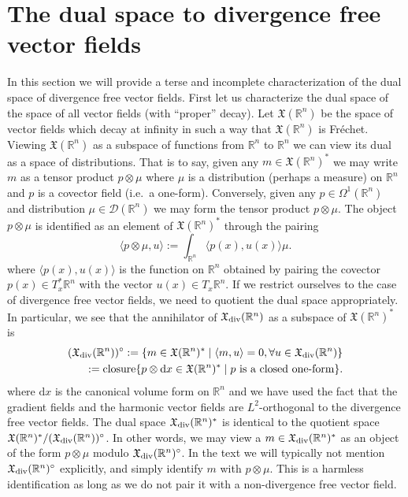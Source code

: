 \documentclass[12pt]{amsart}
\newcommand{\R}{\ensuremath{\mathbb{R}}}
\newcommand{\dx}{\ensuremath{\textrm{d}x}}
\begin{document}
\section{The dual space to divergence free vector fields}
\label{sec:measure_valued_momap}
In this section we will provide a terse and incomplete
characterization of the dual space of divergence free
vector fields.  First let us characterize the dual space of the space of all vector fields (with ``proper'' decay).
Let $\mathfrak{X}(\R^n)$ be the space of vector fields which decay at infinity
in such a way that $\mathfrak{X}(\R^n)$ is Fr\'echet.
Viewing $\mathfrak{X}(\R^n)$ as a subspace of functions from $\R^n$ to $\R^n$
we can view its dual as a space of distributions.
That is to say, given any $m \in \mathfrak{X}(\R^n)^*$ we may write $m$ as a tensor
product $p \otimes \mu$ where $\mu$ is a distribution (perhaps a measure)
on $\R^n$ and $p$ is a covector field (i.e.\ a one-form).
Conversely, given any $p \in \Omega^1(\R^n)$ and distribution $\mu \in \mathcal{D}(\R^n)$
we may form the tensor product $p \otimes \mu$.
The object $p\otimes \mu$ is identified as an element of $\mathfrak{X}(\R^n)^*$ through
the pairing
\begin{equation*}
	\langle p \otimes \mu , u \rangle :=  \int_{\R^n} \langle p(x) , u(x) \rangle \mu.
\end{equation*}
where $\langle p(x),u(x) \rangle$ is the function on $\R^n$ obtained by pairing the covector $p(x) \in T_x^*\R^n$ with the vector $u(x) \in T_x\R^n$.
If we restrict ourselves to the case of divergence free vector fields, we need to quotient
the dual space appropriately.  In particular, we see that the annihilator of $\mathfrak{X}_{\rm div}(\R^n)$
as a subspace of $\mathfrak{X}(\R^n)^*$ is
\begin{align*}
	(\mathfrak{X}_{\rm div}(\R^n) )^\circ := \{ m \in \mathfrak{X}(\R^n)^* \mid \langle m , u \rangle = 0 , \forall u \in \mathfrak{X}_{\rm div}(\R^n) \}\\
		:= {\rm closure}\{ p \otimes \dx \in \mathfrak{X}(\R^n)^* \mid p \text{ is a closed one-form} \}.
\end{align*}
where $\dx$ is the canonical volume form on $\R^n$ and
we have used the fact that the gradient fields and the harmonic vector fields are $L^2$-orthogonal to the divergence free vector fields.
The dual space $\mathfrak{X}_{\rm div}(\R^n)^*$ is identical to the quotient space $\mathfrak{X}(\R^n)^* / (\mathfrak{X}_{\rm div}(\R^n))^\circ$.
In other words, we may view a $m \in \mathfrak{X}_{\rm div}(\R^n)^*$ as an object of the form $p \otimes \mu$ modulo $\mathfrak{X}_{\rm div}(\R^n)^\circ$.
In the text we will typically not mention $\mathfrak{X}_{\rm div}(\R^n)^\circ$ explicitly, and simply identify $m$ with $p \otimes \mu$.
This is a harmless identification as long as we do not pair it with a non-divergence free vector field.
\end{document}
